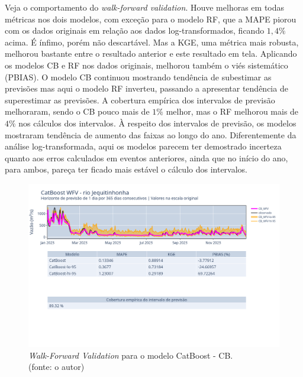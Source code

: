 Veja o comportamento do \textit{walk-forward validation}. Houve melhoras em todas métricas nos dois modelos, com exceção para o modelo RF, que a MAPE piorou com os dados originais em relação aos dados log-transformados, ficando $1,4\%$ acima. É ínfimo, porém não descartável. Mas a KGE, uma métrica mais robusta, melhorou bastante entre o resultado anterior e este resultado em tela. Aplicando os modelos CB e RF nos dados originais, melhorou também o viés sistemático (PBIAS). O modelo CB continuou mostrando tendência de subestimar as previsões mas aqui o modelo RF inverteu, passando a apresentar tendência de superestimar as previsões. A cobertura empírica dos intervalos de previsão melhoraram, sendo o CB pouco mais de $1\%$ melhor, mas o RF melhorou mais de $4\%$ nos cálculos dos intervalos. À respeito dos intervalos de previsão, os modelos mostraram tendência de aumento das faixas ao longo do ano. Diferentemente da análise log-transformada, aqui os modelos parecem ter demostrado incerteza quanto aos erros calculados em eventos anteriores, ainda que no início do ano, para ambos, pareça ter ficado mais estável o cálculo dos intervalos.

\begin{figure}[!h]
\centering
\includegraphics[scale=0.33]{Figuras/jequiti/wfv/CB/CB_WFV_ORIG.png}
\caption{\textit{Walk-Forward Validation} para o modelo CatBoost - CB.\\(fonte: o autor)}
\label{fig:jequiti_CB_WFV_ORIG}
\end{figure}


